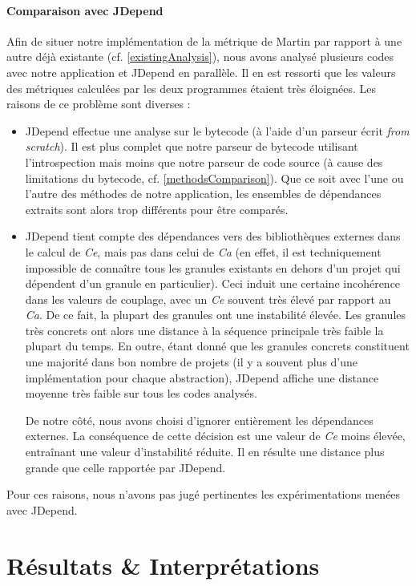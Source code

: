 \documentclass{scrartcl}
\begin{document}
    \paragraph{Comparaison avec JDepend} Afin de situer notre implémentation de la métrique de Martin par rapport à une autre déjà existante (cf. \ref{existingAnalysis}), nous avons analysé plusieurs codes avec notre application et JDepend en parallèle. Il en est ressorti que les valeurs des métriques calculées par les deux programmes étaient très éloignées. Les raisons de ce problème sont diverses :
    \begin{itemize}
        \item JDepend effectue une analyse sur le bytecode (à l'aide d'un parseur écrit \textit{from scratch}). Il est plus complet que notre parseur de bytecode utilisant l'introspection mais moins que notre parseur de code source (à cause des limitations du bytecode, cf. \ref{methodsComparison}). Que ce soit avec l'une ou l'autre des méthodes de notre application, les ensembles de dépendances extraits sont alors trop différents pour être comparés.
        \item JDepend tient compte des dépendances vers des bibliothèques externes dans le calcul de \emph{Ce}, mais pas dans celui de \emph{Ca} (en effet, il est techniquement impossible de connaître tous les granules existants en dehors d'un projet qui dépendent d'un granule en particulier). Ceci induit une certaine incohérence dans les valeurs de couplage, avec un \emph{Ce} souvent très élevé par rapport au \emph{Ca}. De ce fait, la plupart des granules ont une instabilité élevée. Les granules très concrets ont alors une distance à la séquence principale très faible la plupart du temps. En outre, étant donné que les granules concrets constituent une majorité dans bon nombre de projets (il y a souvent plus d'une implémentation pour chaque abstraction), JDepend affiche une distance moyenne très faible sur tous les codes analysés.

        De notre côté, nous avons choisi d'ignorer entièrement les dépendances externes. La conséquence de cette décision est une valeur de \emph{Ce} moins élevée, entraînant une valeur d'instabilité réduite. Il en résulte une distance plus grande que celle rapportée par JDepend.
    \end{itemize}
    Pour ces raisons, nous n'avons pas jugé pertinentes les expérimentations menées avec JDepend.




\newpage
\section{Résultats \& Interprétations}
\end{document}
